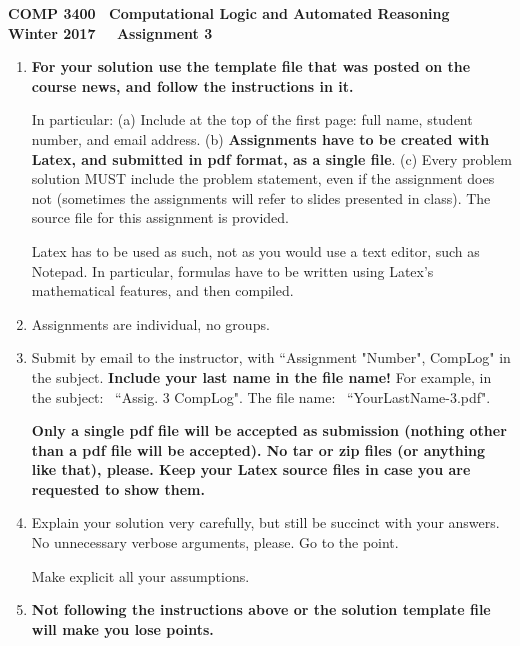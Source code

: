 \documentclass[fullapage,12pt]{article}
\begin{document}
\thispagestyle{empty}

\vspace*{-3.5cm}
\begin{center} \bf \large COMP 3400~ Computational Logic and Automated Reasoning\\ Winter 2017~~ Assignment 3
\end{center}

{\small {}
\begin{enumerate}
\item {\bf \Large For your solution use the template file that was posted on the course news, and follow the instructions in it.}

In particular: (a) Include at the top of the first page: full name, student number, and email address.
(b) {\bf Assignments have to be created with Latex, and submitted in pdf format, as a single file}. (c) Every problem solution MUST include
the problem statement, even if the assignment does not (sometimes the assignments will refer to slides presented in class). The source file for this assignment is provided.

Latex has to be used as such, not as you would use a text editor, such as Notepad. In particular,  formulas have to be written using Latex's mathematical
features, and then compiled.

\item Assignments are individual, no groups.
\item  %
Submit by email to the instructor, with ``Assignment "Number", CompLog" in the subject. {\bf Include your last name in the file name!} For example,
in the subject: \ ``Assig. 3 CompLog". The file name: \ ``YourLastName-3.pdf".

{\bf Only a single pdf file will be accepted as submission (nothing other than a pdf file will be accepted). No tar or zip files (or anything like that), please. Keep your Latex source files in case you are requested to show them.}

\item Explain your solution very carefully, but still be succinct with your answers. No unnecessary verbose arguments, please. Go to the point.

Make explicit all your assumptions.

\item {\bf Not following the instructions above or the solution template file will make you lose points.}
\end{enumerate}}
\end{document}
